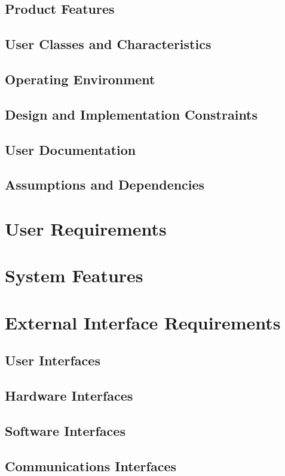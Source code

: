\documentclass[10pt,a4paper,titlepage]{article}
\begin{document}
	\subsection{Product Features}
	\subsection{User Classes and Characteristics}
	\subsection{Operating Environment}
	\subsection{Design and Implementation Constraints}
	\subsection{User Documentation}
	\subsection{Assumptions and Dependencies}
	
	\section{User Requirements}

	\section{System Features}

	\section{External Interface Requirements}
	\subsection{User Interfaces}
	\subsection{Hardware Interfaces}
	\subsection{Software Interfaces}
	\subsection{Communications Interfaces}
\end{document}
